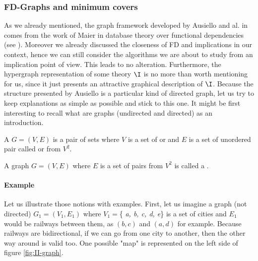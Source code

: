 \subsubsection{FD-Graphs and minimum covers}

As we already mentioned, the graph framework developed by Ausiello and al. in
\cite{ausiello_graph_1983, ausiello_minimal_1986} comes from the work of Maier
in database theory over functional dependencies (see \cite{maier_theory_1983}).
Moreover we already discussed the closeness of FD and implications in our 
context, hence we can still consider the algorithms we are about to study from
an implication point of view. This leads to no alteration. Furthermore, the
hypergraph representation of some theory $\I$ is no more than worth mentioning
for us, since it just presents an attractive graphical description of $\I$.
Because the structure presented by Ausiello is a particular kind of directed
graph, let us try to keep explanations as simple as possible and stick to this
one. It might be first interesting to recall what are graphs (undirected and 
directed) as an introduction.

\begin{definition} A  $G = (V, E)$ is a pair
of sets where $V$ is a set of  or  and $E$ is
a set of unordered pair called  or  from $V^2$.
\end{definition}

\begin{definition} A graph $G = (V, E)$ where $E$ is
a set of  pairs from $V^2$ is called a .	
\end{definition}

\paragraph{Example} Let us illustrate those notions with examples. First, let us
imagine a graph (not directed) $G_1 = (V_1, E_1)$ where $V_1 = $\{ 
\textit{a, b, c, d, e}\} is a set of cities and
$E_1$ would be railways between them, as $(b, c)$ and $(a, d)$ for example. 
Because railways are bidirectional, if we can go from one city to another, then 
the other way around is valid too. One possible "map" is represented 
on the left side of figure \ref{fig:II-graph}.

\begin{figure}[ht]
	
\end{figure}

